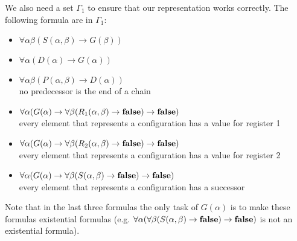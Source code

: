 We also need a set $\Gamma_1$ to ensure that our representation works correctly. The following formula are in $\Gamma_1$:
\begin{itemize}
	\item $\forall\alpha\beta(S(\alpha,\beta)\to G(\beta))$
	\item $\forall\alpha(D(\alpha)\to G(\alpha))$
	\item $\forall\alpha\beta(P(\alpha,\beta)\to D(\alpha))$\\no predecessor is the end of a chain	
	\item $\forall\alpha(G(\alpha)\to\forall\beta(R_1(\alpha,\beta)\to\textbf{false})\to\textbf{false})$\\every element that represents a configuration has a value for register 1
	\item $\forall\alpha(G(\alpha)\to\forall\beta(R_2(\alpha,\beta)\to\textbf{false})\to\textbf{false})$\\every element that represents a configuration has a value for register 2
	\item $\forall\alpha(G(\alpha)\to\forall\beta(S(\alpha,\beta)\to\textbf{false})\to\textbf{false})$\\every element that represents a configuration has a successor
\end{itemize}
Note that in the last three formulas the only task of $G(\alpha)$ is to make these formulas existential formulas (e.g. $\forall\alpha(\forall\beta(S(\alpha,\beta)\to\textbf{false})\to\textbf{false})$ is not an existential formula). 


